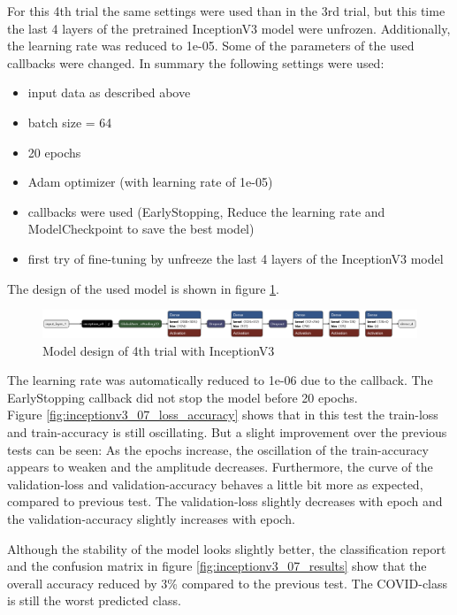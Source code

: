 \documentclass{article}
\begin{document}
For this 4th trial the same settings were used than in the 3rd trial, but this time the last 4 layers of the pretrained InceptionV3 model were unfrozen. Additionally, the learning rate was reduced to 1e-05. Some of the parameters of the used callbacks were changed. In summary the following settings were used: 
\begin{itemize}
\item input data as described above
\item batch size = 64
\item 20 epochs 
\item Adam optimizer (with learning rate of 1e-05)
\item callbacks were used (EarlyStopping, Reduce the learning rate and ModelCheckpoint to save the best model)
\item first try of fine-tuning by unfreeze the last 4 layers of the InceptionV3 model
\end{itemize}

The design of the used model is shown in figure \ref{fig:inceptionv3_07.keras_model_design}.
\begin{figure}%
    \centering
    \includegraphics[width=1.0\linewidth]{inceptionv3_07.keras_model_design_nice.png}
    \caption{Model design of 4th trial with InceptionV3}
    \label{fig:inceptionv3_07.keras_model_design}
\end{figure}

The learning rate was automatically reduced to 1e-06 due to the callback. The EarlyStopping callback did not stop the model before 20 epochs. \\
Figure \ref{fig:inceptionv3_07_loss_accuracy} shows that in this test the train-loss and train-accuracy is still oscillating. But a slight improvement over the previous tests can be seen: As the epochs increase, the oscillation of the train-accuracy appears to weaken and the amplitude decreases. Furthermore, the curve of the validation-loss and validation-accuracy behaves a little bit more as expected, compared to previous test. The validation-loss slightly decreases with epoch and the validation-accuracy slightly increases with epoch. 

Although the stability of the model looks slightly better, the classification report and the confusion matrix in figure \ref{fig:inceptionv3_07_results} show that the overall accuracy reduced by 3\% compared to the previous test. The COVID-class is still the worst predicted class. \\ 
\end{document}
